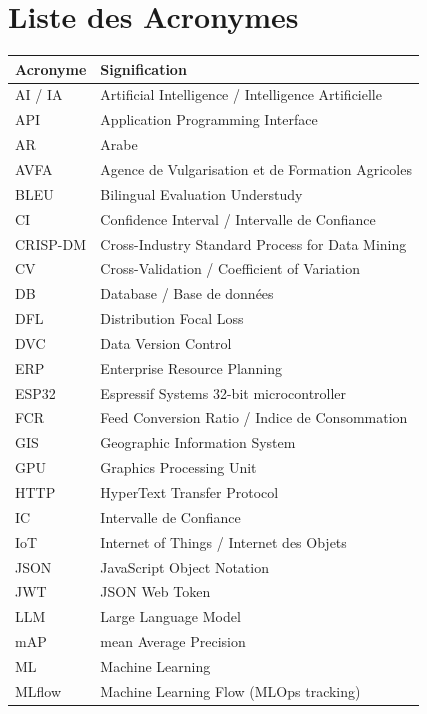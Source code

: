 \documentclass[12pt,a4paper,twoside]{report}
\newcounter{hi}
\begin{document}
\chapter*{Liste des Acronymes}
\begin{longtable}{lp{10cm}}
\toprule
\textbf{Acronyme} & \textbf{Signification} \\
\midrule
\endhead
AI / IA & Artificial Intelligence / Intelligence Artificielle \\
API & Application Programming Interface \\
AR & Arabe \\
AVFA & Agence de Vulgarisation et de Formation Agricoles \\
BLEU & Bilingual Evaluation Understudy \\
CI & Confidence Interval / Intervalle de Confiance \\
CRISP-DM & Cross-Industry Standard Process for Data Mining \\
CV & Cross-Validation / Coefficient of Variation \\
DB & Database / Base de données \\
DFL & Distribution Focal Loss \\
DVC & Data Version Control \\
ERP & Enterprise Resource Planning \\
ESP32 & Espressif Systems 32-bit microcontroller \\
FCR & Feed Conversion Ratio / Indice de Consommation \\
GIS & Geographic Information System \\
GPU & Graphics Processing Unit \\
HTTP & HyperText Transfer Protocol \\
IC & Intervalle de Confiance \\
IoT & Internet of Things / Internet des Objets \\
JSON & JavaScript Object Notation \\
JWT & JSON Web Token \\
LLM & Large Language Model \\
mAP & mean Average Precision \\
ML & Machine Learning \\
MLflow & Machine Learning Flow (MLOps tracking) \\

\end{longtable}
\end{document}
